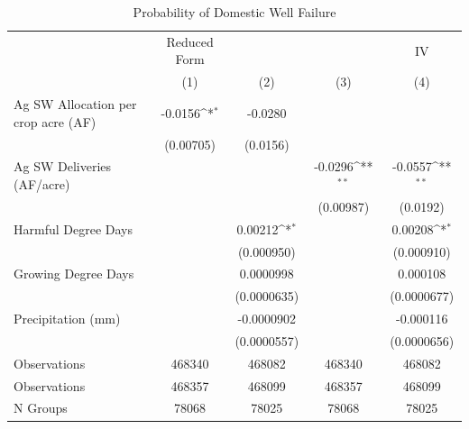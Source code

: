 \begin{table}[htbp]\centering
\def\sym#1{\ifmmode^{#1}\else\(^{#1}\)\fi}
\caption{Probability of Domestic Well Failure}
\begin{tabular}{l*{4}{c}}
\hline\hline
                    &Reduced Form         &                     &                     &          IV         \\
                    &\multicolumn{1}{c}{(1)}         &\multicolumn{1}{c}{(2)}         &\multicolumn{1}{c}{(3)}         &\multicolumn{1}{c}{(4)}         \\
\hline
Ag SW Allocation per crop acre (AF)&     -0.0156\sym{*}  &     -0.0280         &                     &                     \\
                    &   (0.00705)         &    (0.0156)         &                     &                     \\
[1em]
Ag SW Deliveries (AF/acre)&                     &                     &     -0.0296\sym{**} &     -0.0557\sym{**} \\
                    &                     &                     &   (0.00987)         &    (0.0192)         \\
[1em]
Harmful Degree Days &                     &     0.00212\sym{*}  &                     &     0.00208\sym{*}  \\
                    &                     &  (0.000950)         &                     &  (0.000910)         \\
[1em]
Growing Degree Days &                     &   0.0000998         &                     &    0.000108         \\
                    &                     & (0.0000635)         &                     & (0.0000677)         \\
[1em]
Precipitation (mm)  &                     &  -0.0000902         &                     &   -0.000116         \\
                    &                     & (0.0000557)         &                     & (0.0000656)         \\
\hline
Observations        &      468340         &      468082         &      468340         &      468082         \\
Observations        &      468357         &      468099         &      468357         &      468099         \\
N Groups            &       78068         &       78025         &       78068         &       78025         \\

\end{tabular}
\end{table}
